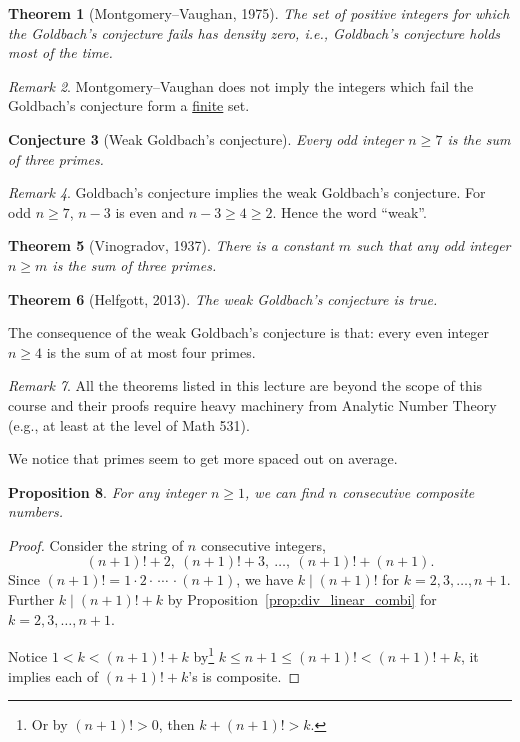 \documentclass{amsbook}
\theoremstyle{plain}
\newtheorem{theorem}{Theorem}[chapter] %
\newtheorem{conjecture}[theorem]{Conjecture}
\newtheorem{proposition}[theorem]{Proposition}
\theoremstyle{definition}
\theoremstyle{remark}
\newtheorem{remark}[theorem]{Remark}
\numberwithin{equation}{chapter}
\numberwithin{figure}{chapter}
\begin{document}
\begin{theorem}[Montgomery--Vaughan, 1975]
  The set of positive integers for which the Goldbach's conjecture fails has density zero, i.e., Goldbach's conjecture holds most of the time.
\end{theorem}
\begin{remark}
Montgomery--Vaughan does not imply the integers which fail the Goldbach's conjecture form a \underline{finite} set.
\end{remark}
\begin{conjecture}[Weak Goldbach's conjecture]
Every odd integer $n \geqslant 7$ is the sum of three primes.
\end{conjecture}
\begin{remark}
Goldbach's conjecture implies the weak Goldbach's conjecture. For odd $n \geqslant 7$, $n - 3$ is even and $n - 3 \geqslant 4 \geqslant 2$. Hence the word ``weak''.
\end{remark}
\begin{theorem}[Vinogradov, 1937]
There is a constant $m$ such that any odd integer $n \geqslant m$ is the sum of three primes.
\end{theorem}
\begin{theorem}[Helfgott, 2013]
The weak Goldbach's conjecture is true.
\end{theorem}
The consequence of the weak Goldbach's conjecture is that: every even integer $n \geqslant 4$ is the sum of at most four primes. 
\begin{remark}
All the theorems listed in this lecture are beyond the scope of this course and their proofs require heavy machinery from Analytic Number Theory (e.g., at least at the level of Math 531).
\end{remark}

We notice that primes seem to get more spaced out on average.
\begin{proposition}
For any integer $n \geqslant 1$, we can find $n$ consecutive composite numbers.
\end{proposition}
\begin{proof}
Consider the string of $n$ consecutive integers,
\[
(n+1)!+2, ~ (n+1)!+3, ~\ldots, ~ (n+1)!+(n+1).
\]
Since $(n+1)! = 1 \cdot 2 \cdot\, \cdots\, \cdot (n+1)$, we have $k \mid (n+1)!$ for $k = 2, 3, \ldots, n+1$. Further $k \mid (n+1)! + k$ by Proposition~\ref{prop:div_linear_combi} for $k = 2, 3, \ldots, n+1$.

Notice $ 1 < k < (n+1)! + k $ by\footnote{Or by $(n+1)!>0$, then $k + (n+1)! > k$.} $k \leqslant n+1 \leqslant (n+1)! < (n+1)! + k$, it implies each of $(n+1)! + k$'s is composite.
\end{proof}
\end{document}
